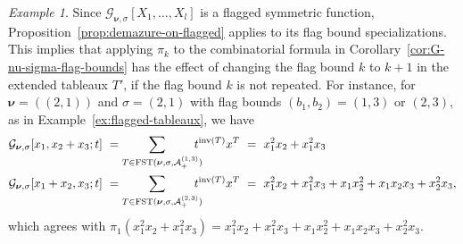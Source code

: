 \documentclass[12pt]{amsart}
\theoremstyle{definition}
\theoremstyle{remark}
\newtheorem{example}[thm]{Example}
\newcommand{\nubold}{{\boldsymbol \nu }}
\newcommand{\Dem}{\pi }
\newcommand{\Acal}{{\mathcal A}}
\newcommand{\Gcal}{{\mathcal G}}
\DeclareMathOperator{\inv}{inv}
\DeclareMathOperator{\FSST}{FST}
\begin{document}
\begin{example}\label{ex:demazure-on-flag-bounds}
Since $\Gcal_{\nubold,\sigma}[X_1, \dots, X_l]$ is a flagged symmetric
function, Proposition~\ref{prop:demazure-on-flagged} applies to its
flag bound specializations.  This implies that applying $\Dem _k$ to
the combinatorial formula in
Corollary~\ref{cor:G-nu-sigma-flag-bounds} has the effect of changing
the flag bound $k$ to $k+1$ in the extended tableaux $T'$, if the flag
bound $k$ is not repeated.  For instance, for $\nubold = ((2,1))$ and
$\sigma = (2,1)$ with flag bounds $(b_1,b_2) = (1,3)$ or $(2,3)$, as
in Example~\ref{ex:flagged-tableaux}, we have
\begin{align}
\Gcal _{\nubold, \sigma}[x_1, x_2+x_3; t] & \ = \sum_{T\in
\FSST(\nubold, \sigma,\Acal_{+}^{(1,3)}) \hspace{-2ex}} t^{\inv(T)}
x^T \  = \  x_1^2x_2+ x_1^2x_3 \\ 
\Gcal _{\nubold, \sigma}[x_1 +x_2,x_3; t] & \ = \sum_{T\in
\FSST(\nubold, \sigma,\Acal_{+}^{(2,3)}) \hspace{-2ex}} t^{\inv(T)}
x^T \  = \ x_1^2x_2+ x_1^2x_3 + x_1 x_2^2 + x_1 x_2 x_3 + x_2^2 x_3,
\end{align}
which agrees with   $\Dem_1 (x_1^2x_2+ x_1^2x_3) =
x_1^2x_2+ x_1^2x_3 + x_1 x_2^2 + x_1 x_2 x_3 + x_2^2 x_3 $.
\end{example}
\end{document}

